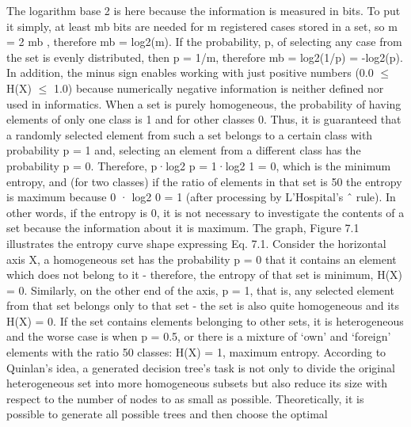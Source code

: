 \documentclass[11pt,openany,executivepaper]{book}
\begin{document}
The logarithm base 2 is here because the information is measured in bits. To
put it simply, at least mb bits are needed for m registered cases stored in a set,
so m = 2
mb , therefore mb = log2(m). If the probability, p, of selecting any case
from the set is evenly distributed, then p = 1/m, therefore mb = log2(1/p) =
-log2(p). In addition, the minus sign enables working with just positive numbers
(0.0 $\leq$ H(X) $\leq$ 1.0) because numerically negative information is neither defined
nor used in informatics.
When a set is purely homogeneous, the probability of having elements of
only one class is 1 and for other classes 0. Thus, it is guaranteed that a randomly
selected element from such a set belongs to a certain class with probability p =
1 and, selecting an element from a different class has the probability p = 0.
Therefore, p·log2
p = 1·log2
1 = 0, which is the minimum entropy, and (for two
classes) if the ratio of elements in that set is 50%
the entropy is maximum because 0 · log2
0 = 1 (after processing by L’Hospital’s ˆ
rule). In other words, if the entropy is 0, it is not necessary to investigate the
contents of a set because the information about it is maximum.
The graph, Figure 7.1 illustrates the entropy curve shape expressing Eq. 7.1.
Consider the horizontal axis X, a homogeneous set has the probability p = 0 that
it contains an element which does not belong to it - therefore, the entropy of that
set is minimum, H(X) = 0. Similarly, on the other end of the axis, p = 1, that
is, any selected element from that set belongs only to that set - the set is also
quite homogeneous and its H(X) = 0. If the set contains elements belonging
to other sets, it is heterogeneous and the worse case is when p = 0.5, or there
is a mixture of ‘own’ and ‘foreign’ elements with the ratio 50%
classes: H(X) = 1, maximum entropy.
According to Quinlan’s idea, a generated decision tree’s task is not only to
divide the original heterogeneous set into more homogeneous subsets but also
reduce its size with respect to the number of nodes to as small as possible. Theoretically, it is possible to generate all possible trees and then choose the optimal
\end{document}
